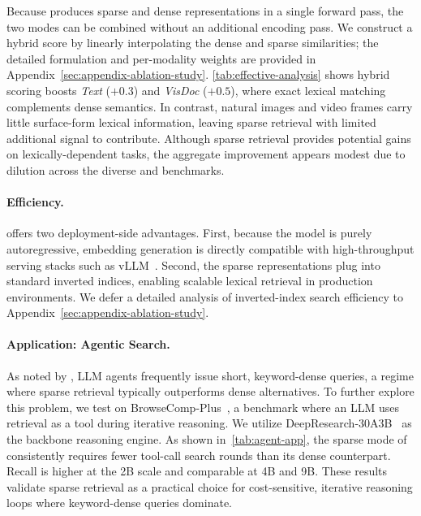 Because \ours produces sparse and dense representations in a single forward pass, the two modes can be combined without an additional encoding pass. We construct a hybrid score by linearly interpolating the dense and sparse similarities; the detailed formulation and per-modality weights are provided in Appendix~\ref{sec:appendix-ablation-study}. 
\autoref{tab:effective-analysis} shows hybrid scoring boosts \emph{Text} ($+0.3$) and \emph{VisDoc} ($+0.5$), where exact lexical matching complements dense semantics. In contrast, natural images and video frames carry little surface-form lexical information, leaving sparse retrieval with limited additional signal to contribute. Although sparse retrieval provides potential gains on lexically-dependent tasks, the aggregate improvement appears modest due to dilution across the diverse \mmebv and \beir benchmarks.


\paragraph{Efficiency.} \label{sec:efficiency}


\ours offers two deployment-side advantages. First, because the model is purely autoregressive, embedding generation is directly compatible with high-throughput serving stacks such as vLLM~\citep{vllm}. Second, the sparse representations plug into standard inverted indices, enabling scalable lexical retrieval in production environments. We defer a detailed analysis of inverted-index search efficiency to Appendix~\ref{sec:appendix-ablation-study}. 

\paragraph{Application: Agentic Search.} \label{sec:application}

As noted by \citet{meng2026revisiting}, LLM agents frequently issue short, keyword-dense queries, a regime where sparse retrieval typically outperforms dense alternatives. 
To further explore this problem, we test \ours on BrowseComp-Plus~\citep{browsecompplus}, a benchmark where an LLM uses retrieval as a tool during iterative reasoning. We utilize DeepResearch-30A3B~\citep{tongyidr} as the backbone reasoning engine. As shown in~\autoref{tab:agent-app}, the sparse mode of \ours consistently requires fewer tool-call search rounds than its dense counterpart. Recall is higher at the 2B scale and comparable at 4B and 9B. These results validate sparse retrieval as a practical choice for cost-sensitive, iterative reasoning loops where keyword-dense queries dominate. 